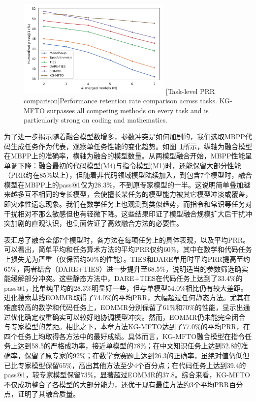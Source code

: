 \documentclass[../main.tex]{subfiles}
\begin{document}
\begin{figure}
	\centering
	\includegraphics[width=0.67\textwidth]{KG-MFTO/figure2_single_task_coding.pdf}
	[Task-level PRR comparison]{Performance retention rate comparison across tasks. KG-MFTO surpasses all competing methods on every task and is particularly strong on coding and mathematics.}
	\label{fig:task-wise-prr}
\end{figure}

为了进一步揭示随着融合模型数增多，参数冲突是如何加剧的，我们选取MBPP代码生成任务作为代表，观察单任务性能的变化趋势。如图~\ref{fig:task-wise-prr}所示，纵轴为融合模型在MBPP上的准确率，横轴为融合的模型数量。从两模型融合开始，MBPP性能呈单调下降：融合最初的代码模型(M4)与指令模型(M1)时，还能保留大部分性能（PRR约在85\%以上），但随着非代码领域模型陆续加入，到包含7个模型时，融合模型在MBPP上的pass@1仅为28.3\%，不到原专家模型的一半。这说明简单叠加越来越多互不相同的专长模型，会使擅长某任务的模型能力被其它模型冲淡或覆盖，即灾难性遗忘现象。我们在数学任务上也观测到类似趋势，而指令和常识等任务对干扰相对不那么敏感但也有轻微下降。这些结果印证了模型融合规模扩大后干扰冲突加剧的直观认识，也侧面佐证了高效融合方法的必要性。

表汇总了融合全部7个模型时，各方法在每项任务上的具体表现，以及平均PRR。可以看出，简单平均和任务算术方法的平均PRR仅约60\%，其中在数学和代码任务上损失尤为严重（仅保留约50\%的性能）。TIES和DARE单用时平均PRR提高至约65\%，两者结合（DARE+TIES）进一步提升至68.5\%，说明适当的参数筛选确实能缓解部分冲突。这些静态方法中，DARE+TIES在代码任务上达到了33.4\%的pass@1，比单纯平均的28.3\%明显好一些，但与单模型54.0\%相比仍有较大差距。进化搜索基线EOMMR取得了74.0\%的平均PRR，大幅超过任何静态方法。尤其在难度较高的数学和代码任务上，EOMMR分别保留了61\%和70\%的性能，显示出通过优化确定权重确实可以较好地协调模型冲突。然而，EOMMR仍未能完全闭合与专家模型的差距。相比之下，本章方法KG-MFTO达到了77.0\%的平均PRR，在四个任务上均取得各方法中的最好成绩。具体而言，KG-MFTO融合模型在指令任务上达到58.5的严格成功率，接近单模型的78\%；在中文知识任务上达到52.8的准确率，保留了原专家的92\%；在数学竞赛题上达到26.3的正确率，虽绝对值仍低但已比专家模型保留65\%，高出其他方法至少4个百分点；在代码任务上达到39.4的pass@1，较专家模型保留73\%，显著超过EOMMR的37.8。综合来看，KG-MFTO不仅成功整合了各模型的大部分能力，还优于现有最佳方法约3个平均PRR百分点，证明了其融合质量。
\end{document}
